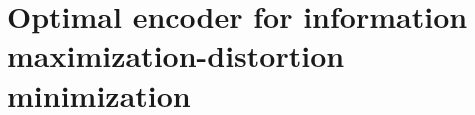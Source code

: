 \documentclass{article}
\newcommand{\E}{\mathbb{E}}
\begin{document}
\section{Optimal encoder for information maximization-distortion minimization}

\end{document}
